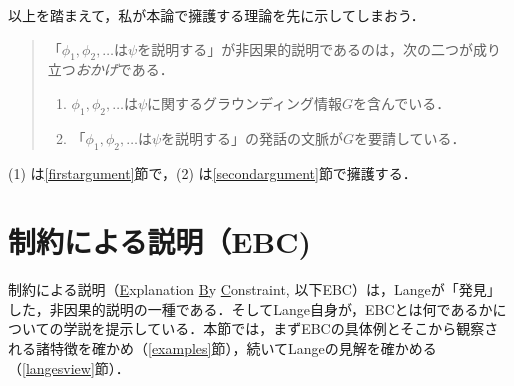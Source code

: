 \documentclass[dvipdfmx,twoside,11pt,uplatex]{jsarticle}
\theoremstyle{definition}
\begin{document}
以上を踏まえて，私が本論で擁護する理論を先に示してしまおう．
\begin{quote}
「$\phi_1, \phi_2, \ldots$は$\psi$を説明する」が非因果的説明であるのは，次の二つが成り立つ\emph{おかげ}である．
	\begin{enumerate}
	\item $\phi_1, \phi_2, \ldots$は$\psi$に関するグラウンディング情報$G$を含んでいる．	
	\item 「$\phi_1, \phi_2, \ldots$は$\psi$を説明する」の発話の文脈が$G$を要請している．
	\end{enumerate}
\end{quote}

\noindent(1) は\ref{firstargument}節で，(2) は\ref{secondargument}節で擁護する．

\section{制約による説明（EBC)}\label{explanationbyconstraint}
制約による説明（\underline{E}xplanation \underline{B}y \underline{C}onstraint, 以下EBC）は，Langeが「発見」した，非因果的説明の一種である．そしてLange自身が，EBCとは何であるかについての学説を提示している．本節では，まずEBCの具体例とそこから観察される諸特徴を確かめ（\ref{examples}節），続いてLangeの見解を確かめる（\ref{langesview}節）．
\end{document}
